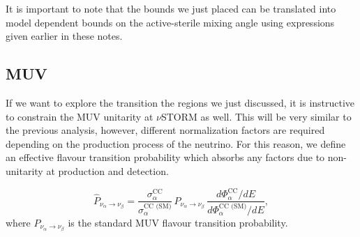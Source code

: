 It is important to note that the bounds we just placed can be translated into model dependent bounds on the active-sterile mixing angle using expressions given earlier in these notes.

\subsection{MUV}

If we want to explore the transition the regions we just discussed, it is instructive to constrain the MUV unitarity at $\nu$STORM as well. This will  be very similar to the previous analysis, however, different normalization factors are required depending on the production process of the neutrino. For this reason, we define an effective flavour transition probability which absorbs any factors due to non-unitarity at production and detection.

\begin{equation}
 \hat{P}_{\nu_{\alpha} \to \nu_{\beta}} = \frac{\sigma^{\text{CC}}_{\alpha}}{\sigma^{\text{CC (SM)}}_{\alpha}} \, P_{\nu_{\alpha} \to \nu_{\beta}} \, \frac{d\Phi^{\text{CC}}_{\alpha}/dE}{d\Phi^{\text{CC (SM)}}_{\alpha}/dE},
\end{equation}
where $P_{\nu_{\alpha} \to \nu_{\beta}}$ is the standard MUV flavour transition probability.

